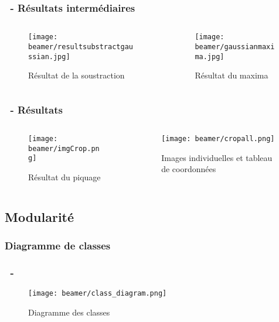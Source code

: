 \documentclass[11pt]{beamer}
\begin{document}
\begin{frame}
\frametitle{\subsecname ~- Résultats intermédiaires}
\begin{columns}
\begin{column}{5cm}
			\begin{figure}
				\texttt{[image: beamer/resultsubstractgaussian.jpg]}
				
				Résultat de la soustraction
			\end{figure}
\end{column}
\begin{column}{5cm}
			\begin{figure}
				\texttt{[image: beamer/gaussianmaxima.jpg]}
				
				Résultat du maxima
			\end{figure}
\end{column}
\end{columns}
\end{frame}
\begin{frame}
\frametitle{\subsecname ~- Résultats}
	\begin{columns}
		\begin{column}{5cm}
			\begin{figure}
				\texttt{[image: beamer/imgCrop.png]}
				
				Résultat du piquage
			\end{figure}
		\end{column}
		\begin{column}{5cm}
			\begin{figure}
				\texttt{[image: beamer/cropall.png]}
				
				Images individuelles et tableau de coordonnées
			\end{figure}
		\end{column}
	\end{columns}
\end{frame}
\subsection{Modularité}
\subsubsection*{Diagramme de classes}
\begin{frame}
\frametitle{\subsecname ~- \subsubsecname}
	\begin{figure}
		\texttt{[image: beamer/class\_diagram.png]}
				
		Diagramme des classes
	\end{figure}
\end{frame}
\end{document}
